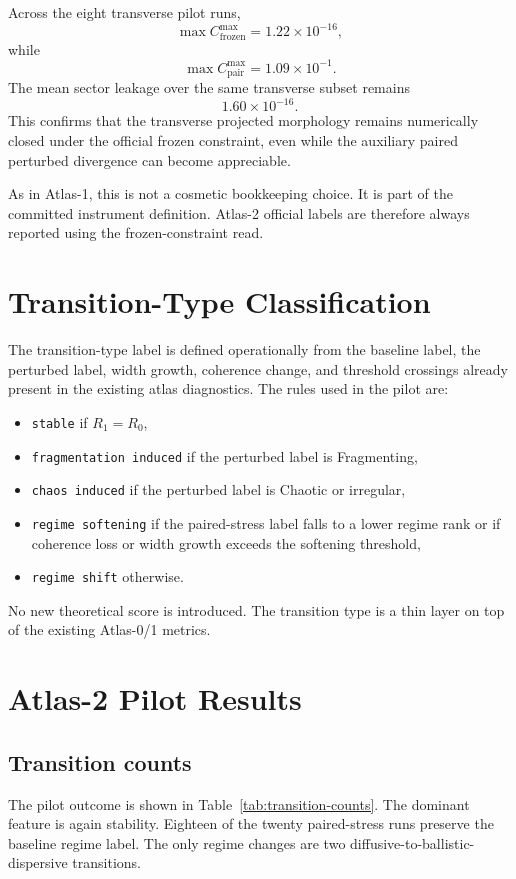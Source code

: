\documentclass[11pt]{article}
\begin{document}
Across the eight transverse pilot runs,
\begin{equation}
\max C_{\mathrm{frozen}}^{\max} = 1.22 \times 10^{-16},
\end{equation}
while
\begin{equation}
\max C_{\mathrm{pair}}^{\max} = 1.09 \times 10^{-1}.
\end{equation}
The mean sector leakage over the same transverse subset remains
\begin{equation}
1.60 \times 10^{-16}.
\end{equation}
This confirms that the transverse projected morphology remains numerically closed under the official frozen constraint, even while the auxiliary paired perturbed divergence can become appreciable.

As in Atlas-1, this is not a cosmetic bookkeeping choice. It is part of the committed instrument definition. Atlas-2 official labels are therefore always reported using the frozen-constraint read.

\section{Transition-Type Classification}
The transition-type label is defined operationally from the baseline label, the perturbed label, width growth, coherence change, and threshold crossings already present in the existing atlas diagnostics. The rules used in the pilot are:
\begin{itemize}
\item \texttt{stable} if $R_1 = R_0$,
\item \texttt{fragmentation induced} if the perturbed label is Fragmenting,
\item \texttt{chaos induced} if the perturbed label is Chaotic or irregular,
\item \texttt{regime softening} if the paired-stress label falls to a lower regime rank or if coherence loss or width growth exceeds the softening threshold,
\item \texttt{regime shift} otherwise.
\end{itemize}
No new theoretical score is introduced. The transition type is a thin layer on top of the existing Atlas-0/1 metrics.

\section{Atlas-2 Pilot Results}
\subsection{Transition counts}
The pilot outcome is shown in Table~\ref{tab:transition-counts}. The dominant feature is again stability. Eighteen of the twenty paired-stress runs preserve the baseline regime label. The only regime changes are two diffusive-to-ballistic-dispersive transitions.
\end{document}
